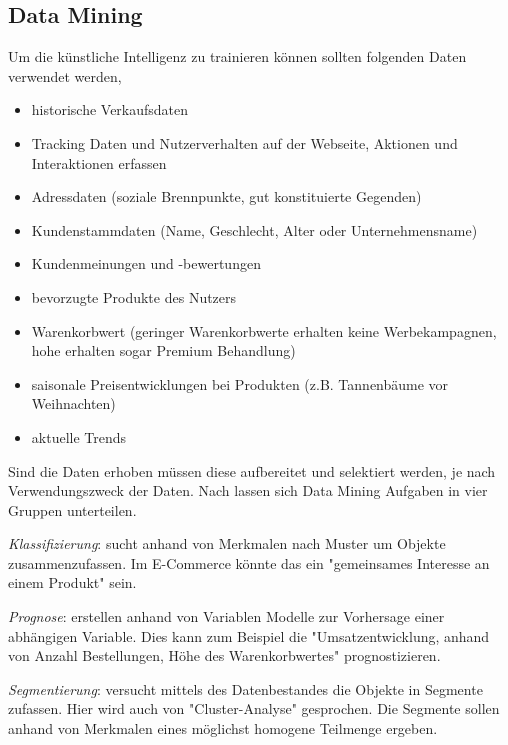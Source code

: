 \subsection{Data Mining}
Um die künstliche Intelligenz zu trainieren können sollten folgenden Daten verwendet werden,

\begin{itemize}
	\item historische Verkaufsdaten
	\item Tracking Daten und Nutzerverhalten auf der Webseite, Aktionen und Interaktionen erfassen
	\item Adressdaten (soziale Brennpunkte, gut konstituierte Gegenden)
	\item Kundenstammdaten (Name, Geschlecht, Alter oder Unternehmensname)
	\item Kundenmeinungen und -bewertungen
	\item bevorzugte Produkte des Nutzers
	\item Warenkorbwert (geringer Warenkorbwerte erhalten keine Werbekampagnen, hohe erhalten sogar Premium Behandlung)
	\item saisonale Preisentwicklungen bei Produkten (z.B. Tannenbäume vor Weihnachten)
	\item aktuelle Trends
\end{itemize}

Sind die Daten erhoben müssen diese aufbereitet und selektiert werden, je nach Verwendungszweck der Daten. Nach \cite{laurenz_data_mining} lassen sich Data Mining Aufgaben in vier Gruppen unterteilen.\vspace{0.2cm}

\textit{Klassifizierung}: sucht anhand von Merkmalen nach Muster um Objekte zusammenzufassen. Im E-Commerce könnte das ein "gemeinsames Interesse an einem Produkt" sein.\vspace{0.2cm}

\textit{Prognose}: erstellen anhand von Variablen Modelle zur Vorhersage einer abhängigen Variable. Dies kann zum Beispiel die "Umsatzentwicklung, anhand von Anzahl Bestellungen, Höhe des Warenkorbwertes" prognostizieren.\vspace{0.2cm}

\textit{Segmentierung}: versucht mittels des Datenbestandes die Objekte in Segmente zufassen. Hier wird auch von "Cluster-Analyse" gesprochen. Die Segmente sollen anhand von Merkmalen eines möglichst homogene Teilmenge ergeben.\vspace{0.2cm}

